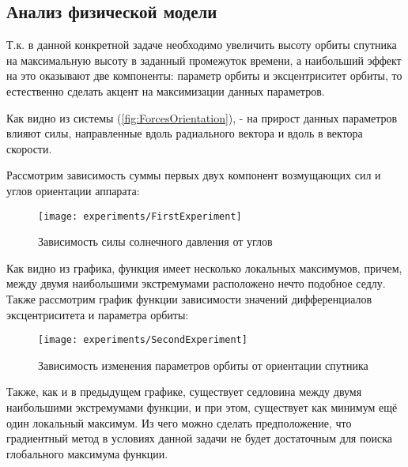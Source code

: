 \subsection{Анализ физической модели}
\noindent\indent Т.к. в данной конкретной задаче необходимо увеличить высоту орбиты
спутника на максимальную высоту в заданный промежуток времени, а наибольший эффект
на это оказывают две компоненты: параметр орбиты и эксцентриситет орбиты, то естественно
сделать акцент на максимизации данных параметров.\par
    Как видно из системы (\ref{fig:ForcesOrientation}), - на прирост данных параметров
влияют силы, направленные вдоль радиального вектора и вдоль в вектора скорости.\par
    Рассмотрим зависимость суммы первых двух компонент возмущающих сил и углов ориентации аппарата:
\begin{figure}[h]
  \centering
  \texttt{[image: experiments/FirstExperiment]}
  \caption{Зависимость силы солнечного давления от углов}
  \label{fig:Force2Angles}
\end{figure}\par
    Как видно из графика, функция имеет несколько локальных максимумов, причем,
между двумя наибольшими экстремумами расположено нечто подобное седлу. Также
рассмотрим график функции зависимости значений дифференциалов эксцентриситета и
параметра орбиты:
\begin{figure}[h]
  \centering
  \texttt{[image: experiments/SecondExperiment]}
  \caption{Зависимость изменения параметров орбиты от ориентации спутника}
  \label{fig:KeplerParams2Angles}
\end{figure}\par
    Также, как и в предыдущем графике, существует седловина между двумя наибольшими
экстремумами функции, и при этом, существует как минимум ещё один локальный максимум.
    Из чего можно сделать предположение, что градиентный метод в условиях данной
задачи не будет достаточным для поиска глобального максимума функции.
